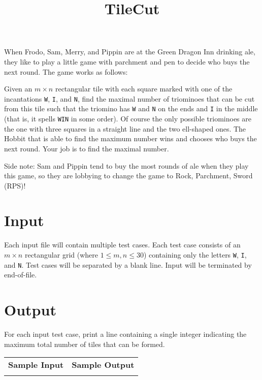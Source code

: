 \documentclass{article}
\title{TileCut}
\date{}
\begin{document}
\maketitle

When Frodo, Sam, Merry, and Pippin are at the Green Dragon Inn drinking ale, they
like to play a little game with parchment and pen to decide who buys the next round.  The
game works as follows: 

Given an $m \times n$ rectangular tile with each square marked with one of the
incantations \texttt{W}, \texttt{I}, and \texttt{N}, find the maximal number of
triominoes that can be cut from this tile such that the triomino has \texttt{W}
and \texttt{N} on the ends and \texttt{I} in the middle (that is, it spells
\texttt{WIN} in some order).  Of course the only possible triominoes are the
one with three squares in a straight line and the two ell-shaped ones.
The Hobbit that is able to find the maximum number wins and chooses who buys
the next round.  Your job is to find the maximal number.  

Side note: Sam and Pippin tend to buy the most rounds of ale when they play this game,
so they are lobbying to change the game to Rock, Parchment, Sword (RPS)!

\section{Input}

Each input file will contain multiple test cases.  Each test case consists of
an $m \times n$ rectangular grid (where $1 \le m, n \le 30$) containing only
the letters \texttt{W}, \texttt{I}, and \texttt{N}.  Test cases will be
separated by a blank line.  Input will be terminated by end-of-file.

\section{Output}

For each input test case, print a line containing a single integer indicating
the maximum total number of tiles that can be formed.

\vskip 16pt
\noindent
\setlength{\extrarowheight}{4pt}
\begin{tabularx}{\textwidth}{ | X | X | }
\hline
\textbf{Sample Input} & \textbf{Sample Output} \\

&

\\
\hline
\end{tabularx}
\end{document}
